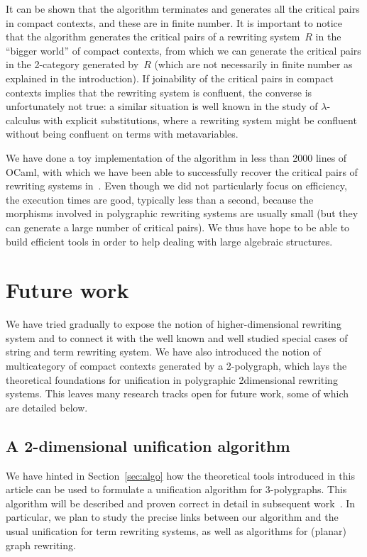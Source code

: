 \documentclass{LMCS}
\begin{document}
It can be shown that the algorithm terminates and generates all the critical
pairs in compact contexts, and these are in finite number. It is important to
notice that the algorithm generates the critical pairs of a rewriting system~$R$
in the ``bigger world'' of compact contexts, from which we can generate the
critical pairs in the 2-category generated by~$R$ (which are not necessarily in
finite number as explained in the introduction). If joinability of the critical
pairs in compact contexts implies that the rewriting system is confluent, the
converse is unfortunately not true: a similar situation is well known in the
study of $\lambda$-calculus with explicit substitutions, where a rewriting system
might be confluent without being confluent on terms with metavariables.

We have done a toy implementation of the algorithm in less than 2000 lines of
OCaml, with which we have been able to successfully recover the critical pairs
of rewriting systems in~\cite{lafont:boolean-circuits}. Even though we did not
particularly focus on efficiency, the execution times are good, typically less
than a second, because the morphisms involved in polygraphic rewriting systems
are usually small (but they can generate a large number of critical pairs). We
thus have hope to be able to build efficient tools in order to help dealing with
large algebraic structures.

\section{Future work}
\label{sec:future-work}
We have tried gradually to expose the notion of higher-dimensional rewriting
system and to connect it with the well known and well studied special cases of
string and term rewriting system. We have also introduced the notion of
multicategory of compact contexts generated by a 2-polygraph, which lays the
theoretical foundations for unification in polygraphic 2\nbd{}dimensional
rewriting systems. This leaves many research tracks open for future work, some
of which are detailed below.

\subsection{A 2-dimensional unification algorithm}
We have hinted in Section~\ref{sec:algo} how the theoretical tools introduced in
this article can be used to formulate a unification algorithm for
3-polygraphs. This algorithm will be described and proven correct in detail in
subsequent work~\cite{mimram:2-cp}. In particular, we plan to study the precise
links between our algorithm and the usual unification for term rewriting
systems, as well as algorithms for (planar) graph rewriting.
\end{document}
